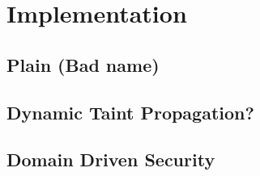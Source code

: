 \chapter{Implementation}


\section{Plain (Bad name)}

\section{Dynamic Taint Propagation?}

\section{Domain Driven Security}